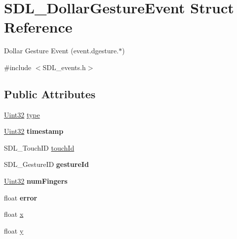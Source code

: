 \hypertarget{struct_s_d_l___dollar_gesture_event}{}\section{S\+D\+L\+\_\+\+Dollar\+Gesture\+Event Struct Reference}
\label{struct_s_d_l___dollar_gesture_event}


Dollar Gesture Event (event.\+dgesture.$\ast$)  




{\ttfamily \#include $<$S\+D\+L\+\_\+events.\+h$>$}

\subsection*{Public Attributes}
\begin{DoxyCompactItemize}
\item 
\hyperlink{_s_d_l__stdinc_8h_add440eff171ea5f55cb00c4a9ab8672d}{Uint32} \hyperlink{struct_s_d_l___dollar_gesture_event_ac7f6948754a1b2eb36edde043bf75ce9}{type}
\item 
\hypertarget{struct_s_d_l___dollar_gesture_event_a3bccd8ebdf30b79c0f4074f6471ec583}{}\hyperlink{_s_d_l__stdinc_8h_add440eff171ea5f55cb00c4a9ab8672d}{Uint32} {\bfseries timestamp}\label{struct_s_d_l___dollar_gesture_event_a3bccd8ebdf30b79c0f4074f6471ec583}

\item 
S\+D\+L\+\_\+\+Touch\+I\+D \hyperlink{struct_s_d_l___dollar_gesture_event_a40402f6911ed0dba48e6b23aa02bd83d}{touch\+Id}
\item 
\hypertarget{struct_s_d_l___dollar_gesture_event_a68968438eae9e58208b14e8c954dec31}{}S\+D\+L\+\_\+\+Gesture\+I\+D {\bfseries gesture\+Id}\label{struct_s_d_l___dollar_gesture_event_a68968438eae9e58208b14e8c954dec31}

\item 
\hypertarget{struct_s_d_l___dollar_gesture_event_a14160d8bad8569f53dd18ed8f64d253f}{}\hyperlink{_s_d_l__stdinc_8h_add440eff171ea5f55cb00c4a9ab8672d}{Uint32} {\bfseries num\+Fingers}\label{struct_s_d_l___dollar_gesture_event_a14160d8bad8569f53dd18ed8f64d253f}

\item 
\hypertarget{struct_s_d_l___dollar_gesture_event_a30aaa8fe0df93615e6692aa20e9c13eb}{}float {\bfseries error}\label{struct_s_d_l___dollar_gesture_event_a30aaa8fe0df93615e6692aa20e9c13eb}

\item 
float \hyperlink{struct_s_d_l___dollar_gesture_event_a9888449bd8842ed96494b4db16a6097b}{x}
\item 
float \hyperlink{struct_s_d_l___dollar_gesture_event_a293b2303acc1cfc63c167c5525e6eab5}{y}
\end{DoxyCompactItemize}


